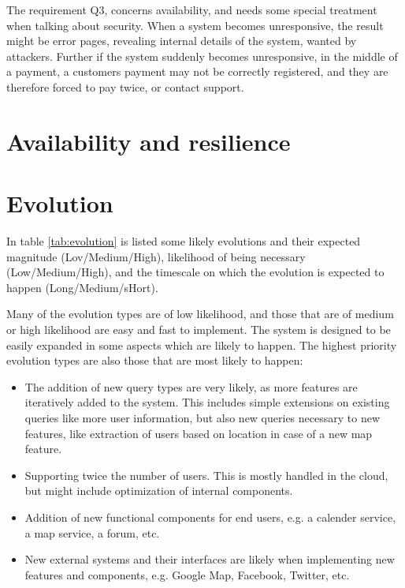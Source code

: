 The requirement Q3, concerns availability, and needs some special treatment
when talking about security. When a system becomes unresponsive, the result
might be error pages, revealing internal details of the system, wanted by
attackers. Further if the system suddenly becomes unresponsive, in the middle
of a payment, a customers payment may not be correctly registered, and they are
therefore forced to pay twice, or contact support.

\section{Availability and resilience}
\label{sec:avail-resil}


\section{Evolution}
\label{sec:evolution}
In table \ref{tab:evolution} is listed some likely evolutions and their expected magnitude (Lov/Medium/High), likelihood of being necessary (Low/Medium/High), and the timescale on which the evolution is expected to happen (Long/Medium/sHort).

Many of the evolution types are of low likelihood, and those that are of medium or high likelihood are easy and fast to implement. The system is designed to be easily expanded in some aspects which are likely to happen. The highest priority evolution types are also those that are most likely to happen:
\begin{itemize}
\item The addition of new query types are very likely, as more features are iteratively added to the system. This includes simple extensions on existing queries like more user information, but also new queries necessary to new features, like extraction of users based on location in case of a new map feature.
\item Supporting twice the number of users. This is mostly handled in the cloud, but might include optimization of internal components.
\item Addition of new functional components for end users, e.g. a calender service, a map service, a forum, etc.
\item New external systems and their interfaces are likely when implementing new features and components, e.g. Google Map, Facebook, Twitter, etc. 
\end{itemize}

